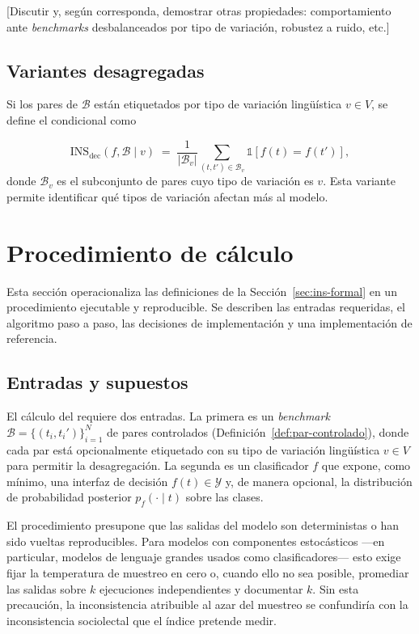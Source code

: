 [Discutir y, según corresponda, demostrar otras propiedades: comportamiento
ante \emph{benchmarks} desbalanceados por tipo de variación, robustez a
ruido, etc.]

\subsection{Variantes desagregadas}

Si los pares de $\mathcal{B}$ están etiquetados por tipo de variación
lingüística $v \in V$, se define el \INS condicional como

\[
  \mathrm{INS}_{\mathrm{dec}}(f, \mathcal{B} \mid v)
  \;=\;
  \frac{1}{|\mathcal{B}_v|}
  \sum_{(t,t') \in \mathcal{B}_v}
  \mathbb{1}\!\left[ f(t) = f(t') \right],
\]
\noindent donde $\mathcal{B}_v$ es el subconjunto de pares cuyo tipo de
variación es $v$. Esta variante permite identificar qué tipos de variación
afectan más al modelo.

\section{Procedimiento de cálculo}
\label{sec:ins-procedimiento}

Esta sección operacionaliza las definiciones de la
Sección~\ref{sec:ins-formal} en un procedimiento ejecutable y reproducible.
Se describen las entradas requeridas, el algoritmo paso a paso, las
decisiones de implementación y una implementación de referencia.

\subsection{Entradas y supuestos}

El cálculo del \INS requiere dos entradas. La primera es un \emph{benchmark}
$\mathcal{B} = \{(t_i, t_i')\}_{i=1}^{N}$ de pares controlados
(Definición~\ref{def:par-controlado}), donde cada par está opcionalmente
etiquetado con su tipo de variación lingüística $v \in V$ para permitir la
desagregación. La segunda es un clasificador $f$ que expone, como mínimo, una
interfaz de decisión $f(t) \in \mathcal{Y}$ y, de manera opcional, la
distribución de probabilidad posterior $p_f(\cdot \mid t)$ sobre las clases.

El procedimiento presupone que las salidas del modelo son deterministas o han
sido vueltas reproducibles. Para modelos con componentes estocásticos ---en
particular, modelos de lenguaje grandes usados como clasificadores--- esto
exige fijar la temperatura de muestreo en cero o, cuando ello no sea posible,
promediar las salidas sobre $k$ ejecuciones independientes y documentar $k$.
Sin esta precaución, la inconsistencia atribuible al azar del muestreo se
confundiría con la inconsistencia sociolectal que el índice pretende medir.

